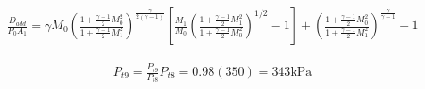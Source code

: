 \begin{align*}
    \frac{D_{add}}{P_0A_1}=\gamma M_0\left(
        \frac{1 + \frac{\gamma-1}{2}M_0^2}{1 + \frac{\gamma-1}{2}M_1^2}
    \right)^{\frac{\gamma}{2(\gamma-1)}}\left[
        \frac{M_1}{M_0}\left(
            \frac{1 + \frac{\gamma-1}{2}M_1^2}{1 + \frac{\gamma-1}{2}M_0^2}
        \right)^{1/2}-1
    \right] + \left(
        \frac{1 + \frac{\gamma-1}{2}M_0^2}{1 + \frac{\gamma-1}{2}M_1^2}
    \right)^\frac{\gamma}{\gamma-1} -1
\end{align*}


\begin{align*}
    P_{t9}=\frac{P_{t9}}{P_{t8}}P_{t8}=0.98(350)=343\text{kPa}
\end{align*}